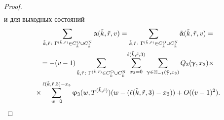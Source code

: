 \begin{proof}
\begin{multline*}
\end{multline*}
и для выходных состояний
\begin{multline*}
    \sum_{\tilde{k}, \tilde{r}\colon \Gamma^{(\tilde{k},  \tilde{r})} \in C_{\tilde{k}}^{\mathrm{O}}\cup C_{\tilde{k}}^{\mathrm{N}}} \alpha(\tilde{k}, \tilde{r}, v) =  \sum_{\tilde{k}, \tilde{r}\colon \Gamma^{(\tilde{k},  \tilde{r})} \in C_{\tilde{k}}^{\mathrm{O}}\cup C_{\tilde{k}}^{\mathrm{N}}} \tilde{\alpha}(\tilde{k}, \tilde{r}, v) = \\ \pagebreak[1] =
    -(v-1)\sum_{\tilde{k}, \tilde{r}\colon \Gamma^{(\tilde{k},  \tilde{r})} \in C_{\tilde{k}}^{\mathrm{O}}\cup C_{\tilde{k}}^{\mathrm{N}}} \sum_{x_3=0}^{\ell(\tilde{k}, \tilde{r}, 3)}\sum_{\gamma \in {\mathbb H}_{-1}(\tilde{\gamma}, x_3)} Q_3(\gamma, x_3)\times\\
    \times\sum_{w=0}^{\ell(\tilde{k}, \tilde{r}, 3) - x_3} \varphi_3(w, T^{(\tilde{k}, \tilde{r})}) (w-(\ell(\tilde{k}, \tilde{r}, 3)-x_3)) + O((v-1)^2).
\end{multline*}


\end{proof}
